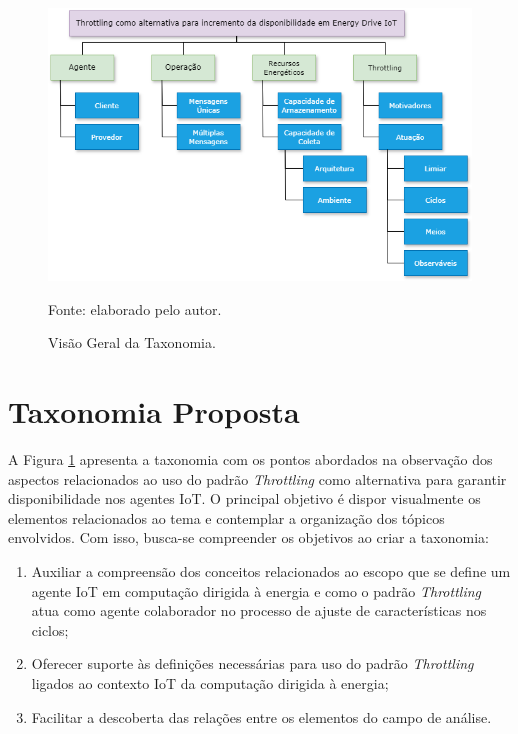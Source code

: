 \begin{figure}[hbt]
	\centering
	\caption{Visão Geral da Taxonomia.}
	\label{fig:visaogeraltaxonomia}
	\includegraphics[width=\textwidth]{Imagens/anexos/anexo_visaogeraltaxonomia.png}	
	
	Fonte: elaborado pelo autor.
\end{figure}

\section{Taxonomia Proposta}

A Figura \ref{fig:visaogeraltaxonomia} apresenta a taxonomia com os pontos abordados na observação dos aspectos relacionados ao uso do padrão \textit{Throttling} como alternativa para garantir disponibilidade nos agentes \acs{IoT}. O principal objetivo é dispor visualmente os elementos relacionados ao tema e contemplar a organização dos tópicos envolvidos. Com isso, busca-se compreender os objetivos ao criar a taxonomia:

\begin{enumerate}
    \item Auxiliar a compreensão dos conceitos relacionados ao escopo que se define um agente \acs{IoT} em computação dirigida à energia e como o padrão \textit{Throttling} atua como agente colaborador no processo de ajuste de características nos ciclos;
  	\item Oferecer suporte às definições necessárias para uso do padrão \textit{Throttling} ligados ao contexto \acs{IoT} da computação dirigida à energia;
  	\item Facilitar a descoberta das relações entre os elementos do campo de análise.
\end{enumerate}

